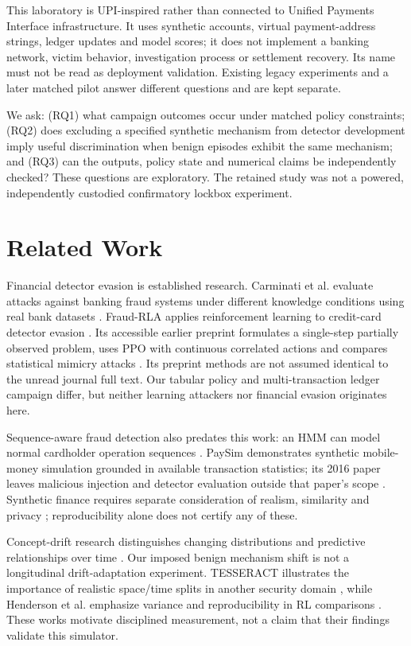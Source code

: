 \documentclass[conference]{IEEEtran}
\begin{document}
This laboratory is UPI-inspired rather than connected to Unified Payments Interface infrastructure. It uses synthetic accounts, virtual payment-address strings, ledger updates and model scores; it does not implement a banking network, victim behavior, investigation process or settlement recovery. Its name must not be read as deployment validation. Existing legacy experiments and a later matched pilot answer different questions and are kept separate.

We ask: (RQ1) what campaign outcomes occur under matched policy constraints; (RQ2) does excluding a specified synthetic mechanism from detector development imply useful discrimination when benign episodes exhibit the same mechanism; and (RQ3) can the outputs, policy state and numerical claims be independently checked? These questions are exploratory. The retained study was not a powered, independently custodied confirmatory lockbox experiment.

\section{Related Work}
Financial detector evasion is established research. Carminati et al. evaluate attacks against banking fraud systems under different knowledge conditions using real bank datasets \cite{carminati}. Fraud-RLA applies reinforcement learning to credit-card detector evasion \cite{fraudrla}. Its accessible earlier preprint formulates a single-step partially observed problem, uses PPO with continuous correlated actions and compares statistical mimicry attacks \cite{fraudrlav1}. Its preprint methods are not assumed identical to the unread journal full text. Our tabular policy and multi-transaction ledger campaign differ, but neither learning attackers nor financial evasion originates here.

Sequence-aware fraud detection also predates this work: an HMM can model normal cardholder operation sequences \cite{hmm}. PaySim demonstrates synthetic mobile-money simulation grounded in available transaction statistics; its 2016 paper leaves malicious injection and detector evaluation outside that paper's scope \cite{paysim}. Synthetic finance requires separate consideration of realism, similarity and privacy \cite{assefa}; reproducibility alone does not certify any of these.

Concept-drift research distinguishes changing distributions and predictive relationships over time \cite{gama}. Our imposed benign mechanism shift is not a longitudinal drift-adaptation experiment. TESSERACT illustrates the importance of realistic space/time splits in another security domain \cite{tesseract}, while Henderson et al. emphasize variance and reproducibility in RL comparisons \cite{henderson}. These works motivate disciplined measurement, not a claim that their findings validate this simulator.
\end{document}

